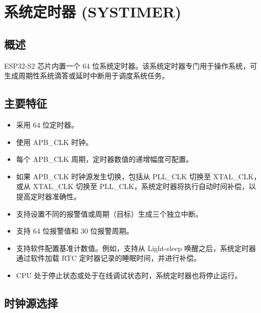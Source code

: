 \documentclass[main\_\_CN.tex]{subfiles}
\begin{document}
\setchineseformatting

\ifglobal
\else
    \listoftodos
    {\let\clearpage\relax \listofdonetodos}
    \tableofcontents
\fi




\hypertarget{systimer}{}
\chapter{系统定时器 (SYSTIMER)}
\label{mod:systimer}


\section{概述}

ESP32-S2 芯片内置一个 64 位系统定时器。该系统定时器专门用于操作系统，可生成周期性系统滴答或延时中断用于调度系统任务。

\section{主要特征}
\begin{itemize}
    \item 采用 64 位定时器。
    \item 使用 APB\_CLK 时钟。
    \item 每个 APB\_CLK 周期，定时器数值的递增幅度可配置。
    \item 如果 APB\_CLK 时钟源发生切换，包括从 PLL\_CLK 切换至 XTAL\_CLK，或从 XTAL\_CLK 切换至 PLL\_CLK，系统定时器将执行自动时间补偿，以提高定时器准确性。
    \item 支持设置不同的报警值或周期（目标）生成三个独立中断。
    \item 支持 64 位报警值和 30 位报警周期。
    \item 支持软件配置基准计数值。例如，支持从 Light-sleep 唤醒之后，系统定时器通过软件加载 RTC 定时器记录的睡眠时间，并进行补偿。
    \item CPU 处于停止状态或处于在线调试状态时，系统定时器也将停止运行。
\end{itemize}

\section{时钟源选择}
\end{document}
